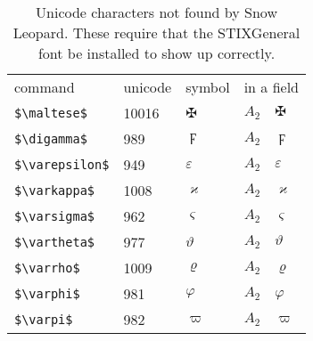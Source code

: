\documentclass{article}
\begin{document}
\begin{table}
\begin{center}
\begin{tabular}{llll}
 command                   & unicode & symbol          & in a field\\
 \verb#$\maltese$#         & 10016   & $\maltese$      & $A_2\quad \maltese$\\
 \verb#$\digamma$#         &   989   & $\digamma$      & $A_2\quad \digamma$\\
 \verb#$\varepsilon$#      &   949   & $\varepsilon$   & $A_2\quad \varepsilon$\\
 \verb#$\varkappa$#        &  1008   & $\varkappa$     & $A_2\quad \varkappa$\\
 \verb#$\varsigma$#        &   962   & $\varsigma$     & $A_2\quad \varsigma$\\
 \verb#$\vartheta$#        &   977   & $\vartheta$     & $A_2\quad \vartheta$\\
 \verb#$\varrho$#          &  1009   & $\varrho$       & $A_2\quad \varrho$\\
 \verb#$\varphi$#          &   981   & $\varphi$       & $A_2\quad \varphi$\\
 \verb#$\varpi$#           &   982   & $\varpi$        & $A_2\quad \varpi$\\
\end{tabular}
\end{center}
\caption{Unicode characters not found by Snow Leopard.  These require that the STIXGeneral
font be installed to show up correctly.}
\end{table}
\end{document}
